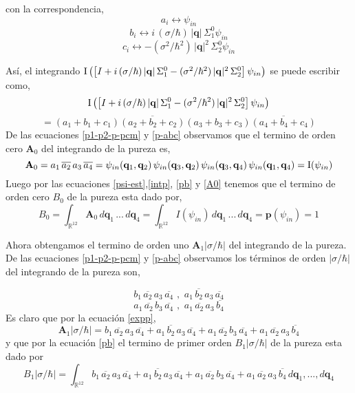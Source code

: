 \documentclass[12pt]{book}
\numberwithin{equation}{chapter}
\def\v{\mathbf}
\def\q{\mathbf{q}}
\def\n{\noindent}
\def\ol{\overline}
\def\R{\mathbb{R}}
\def\I{\hbox{I}}
\def\P{\mathbf{p}}
\def\A{\mathbf{A}}
\begin{document}
\n con la correspondencia,
$$ a_{i} \longleftrightarrow \psi_{in} $$
$$ b_{i} \longleftrightarrow i\,(\sigma/\hbar)\,|\v{q}|\,\Sigma_{1}^{0}\psi_{in} $$
$$ c_{i} \longleftrightarrow -(\sigma^{2}/\hbar^{2})\, |\v{q}|^{2} \,  \Sigma_{2}^{0}\psi_{in} $$

\n As\'i, el integrando $\I \left( \left[I + i\, (\sigma/\hbar)\, |\v{q}|\, \Sigma_{1}^{0} - (\sigma^{2}/\hbar^{2})\, |\v{q}|^{2} \, \Sigma_{2}^{0} \right] \psi_{in} \right)$ se puede escribir como,
$$\I \left( \left[I + i\, (\sigma/\hbar)\, |\v{q}|\, \Sigma_{1}^{0} - (\sigma^{2}/\hbar^{2})\, |\v{q}|^{2} \, \Sigma_{2}^{0} \right] \psi_{in} \right) $$
\begin{equation}\label{p-abc}
= (a_{1}+b_{1}+c_{1}) \ol{(a_{2}+b_{2}+c_{2})} (a_{3}+b_{3}+c_{3}) \ol{(a_{4}+b_{4}+c_{4})}
\end{equation}
De las ecuaciones \eqref{p1-p2-p-pcm} y \eqref{p-abc} observamos que el termino de orden cero $\A_{0}$ del integrando de la pureza es,
\begin{equation}\label{A0}
\A_{0}= a_{1}\, \ol{a_{2}}\, a_{3}\, \ol{a_{4}}= \psi_{in}(\q_{1},\q_{2})\, \psi_{in}(\q_{3},\q_{2}) \, \psi_{in}(\q_{3},\q_{4})\, \psi_{in}(\q_{1},\q_{4}) = \I(\psi_{in})
\end{equation}
Luego por las ecuaciones \eqref{psi-est},\eqref{intp}, \eqref{pb} y \eqref{A0} tenemos que el termino de orden cero $B_{0}$ de la pureza esta dado por,
\begin{equation}\label{B0}
B_{0}= \int_{\R^{12}} \A_{0} \,d\v{q}_{1}\,...\,d\v{q}_{4}=\int_{\R^{12}} I(\psi_{in}) \,d\v{q}_{1}\,...\,d\v{q}_{4}= \P(\psi_{in})=1
\end{equation}

Ahora obtengamos el termino de orden uno $\A_{1} |\sigma/\hbar|$ del integrando de la pureza. De las ecuaciones \eqref{p1-p2-p-pcm} y \eqref{p-abc} observamos los t\'erminos de orden $|\sigma/\hbar|$ del integrando de la pureza son,

$$ b_{1}\,\overline{a_{2}}\,a_{3}\,\overline{a_{4}} \,\,,\,\, a_{1}\, \overline{b_{2}} \, a_{3} \, \overline{a_{4}} $$
$$ a_{1}\, \overline{a_{2}}\, b_{3}\, \overline{a_{4}} \,\,,\,\,  a_{1}\, \overline{a_{2}} \, a_{3}\, \overline{b_{4}} $$
Es claro que por la ecuaci\'on \eqref{expp},
\begin{equation}\label{A1}
\A_{1} |\sigma/\hbar|= b_{1}\,\overline{a_{2}}\,a_{3}\,\overline{a_{4}}+ a_{1}\, \overline{b_{2}} \, a_{3} \, \overline{a_{4}}+a_{1}\, \overline{a_{2}}\, b_{3}\, \overline{a_{4}} +  a_{1}\, \overline{a_{2}} \, a_{3}\, \overline{b_{4}}
\end{equation}
y que por la ecuaci\'on \eqref{pb} el termino de primer orden $B_{1}|\sigma/\hbar|$ de la pureza esta dado por
\begin{equation}\label{A1int}
B_{1}|\sigma/\hbar|= \int_{\R^{12}} b_{1}\,\overline{a_{2}}\,a_{3}\,\overline{a_{4}}+ a_{1}\, \overline{b_{2}} \, a_{3} \, \overline{a_{4}}+a_{1}\, \overline{a_{2}}\, b_{3}\, \overline{a_{4}} +  a_{1}\, \overline{a_{2}} \, a_{3}\, \overline{b_{4}} \, d\q_{1},...,d\q_{4}
\end{equation}
\end{document}
